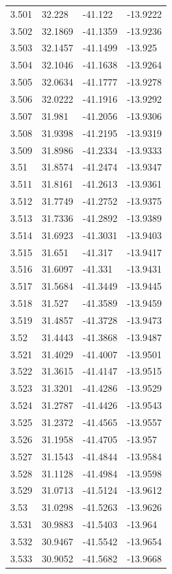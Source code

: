 \begin{tabular}{llll}
3.501 & 32.228 & -41.122 & -13.9222 \\
3.502 & 32.1869 & -41.1359 & -13.9236 \\
3.503 & 32.1457 & -41.1499 & -13.925 \\
3.504 & 32.1046 & -41.1638 & -13.9264 \\
3.505 & 32.0634 & -41.1777 & -13.9278 \\
3.506 & 32.0222 & -41.1916 & -13.9292 \\
3.507 & 31.981 & -41.2056 & -13.9306 \\
3.508 & 31.9398 & -41.2195 & -13.9319 \\
3.509 & 31.8986 & -41.2334 & -13.9333 \\
3.51 & 31.8574 & -41.2474 & -13.9347 \\
3.511 & 31.8161 & -41.2613 & -13.9361 \\
3.512 & 31.7749 & -41.2752 & -13.9375 \\
3.513 & 31.7336 & -41.2892 & -13.9389 \\
3.514 & 31.6923 & -41.3031 & -13.9403 \\
3.515 & 31.651 & -41.317 & -13.9417 \\
3.516 & 31.6097 & -41.331 & -13.9431 \\
3.517 & 31.5684 & -41.3449 & -13.9445 \\
3.518 & 31.527 & -41.3589 & -13.9459 \\
3.519 & 31.4857 & -41.3728 & -13.9473 \\
3.52 & 31.4443 & -41.3868 & -13.9487 \\
3.521 & 31.4029 & -41.4007 & -13.9501 \\
3.522 & 31.3615 & -41.4147 & -13.9515 \\
3.523 & 31.3201 & -41.4286 & -13.9529 \\
3.524 & 31.2787 & -41.4426 & -13.9543 \\
3.525 & 31.2372 & -41.4565 & -13.9557 \\
3.526 & 31.1958 & -41.4705 & -13.957 \\
3.527 & 31.1543 & -41.4844 & -13.9584 \\
3.528 & 31.1128 & -41.4984 & -13.9598 \\
3.529 & 31.0713 & -41.5124 & -13.9612 \\
3.53 & 31.0298 & -41.5263 & -13.9626 \\
3.531 & 30.9883 & -41.5403 & -13.964 \\
3.532 & 30.9467 & -41.5542 & -13.9654 \\
3.533 & 30.9052 & -41.5682 & -13.9668 \\

\end{tabular}
